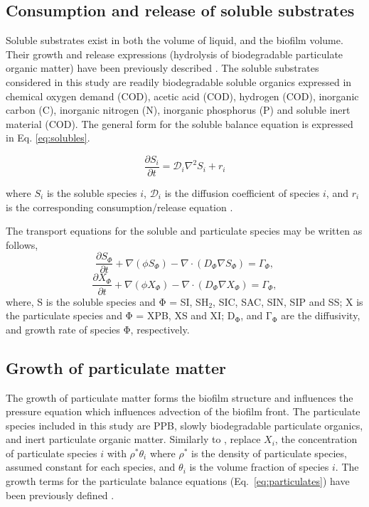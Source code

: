 \subsection{Consumption and release of soluble substrates}
Soluble substrates exist in both the volume of liquid, and the biofilm volume. Their growth and release expressions (hydrolysis of biodegradable particulate organic matter) have been previously described \cite{Puyol2017}. The soluble substrates considered in this study are readily biodegradable soluble organics expressed in chemical oxygen demand (COD), acetic acid (COD), hydrogen (COD), inorganic carbon (C), inorganic nitrogen (N), inorganic phosphorus (P) and soluble inert material (COD). The general form for the soluble balance equation is expressed in Eq. \ref{eq:solubles}.

\begin{equation}
\label{eq:solubles}
\frac{\partial S_i}{\partial t} = \mathcal{D}_i\nabla^2 S_i + r_{i}
\end{equation}

where $S_i$ is the soluble species $i$, $\mathcal{D}_i$ is the diffusion coefficient of species $i$, and $r_i$ is the corresponding consumption/release equation \cite{Puyol2017}.

The transport equations for the soluble and particulate species may be written as follows,
\begin{equation}
\label{eq:solublesD}
\frac{\partial S_{\Phi}}{\partial t} + \nabla (\phi S_{\Phi}) - \nabla \cdot (D_{\Phi} \nabla S_{\Phi}) = \Gamma_{\Phi}, 
\end{equation}
\begin{equation}
\label{eq:particulate}
\frac{\partial X_{\Phi}}{\partial t} + \nabla (\phi X_{\Phi}) - \nabla \cdot (D_{\Phi} \nabla X_{\Phi}) = \Gamma_{\Phi}, 
\end{equation}
where, S is the soluble species and $\mathrm{\Phi}$ = SI, SH$\mathrm{_2}$, SIC, SAC, SIN, SIP and SS; X is the particulate species and $\mathrm{\Phi}$ = XPB, XS and XI; $\mathrm{D_{\Phi}}$, and $\mathrm{\Gamma_{\Phi}}$ are the diffusivity, and growth rate of species $\mathrm{\Phi}$, respectively.  


\subsection{Growth of particulate matter}
The growth of particulate matter forms the biofilm structure and influences the pressure equation which influences advection of the biofilm front. The particulate species included in this study are PPB, slowly biodegradable particulate organics, and inert particulate organic matter. Similarly to \cite{alpkvist2007}, replace $X_i$, the concentration of particulate species $i$ with $\rho^*\theta_i$ where $\rho^*$ is the density of particulate species, assumed constant for each species, and $\theta_i$ is the volume fraction of species $i$. The growth terms for the particulate balance equations (Eq.~\ref{eq:particulates}) have been previously defined \cite{Puyol2017}.


